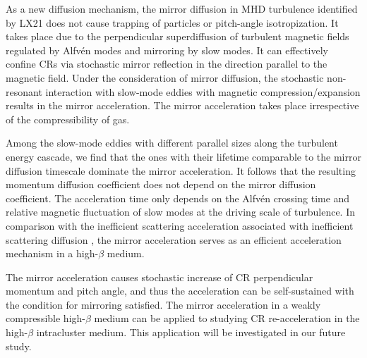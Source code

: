 \documentclass[preprint2,twocolumn,times,tighten]{aastex63}
\begin{document}
{As a new diffusion mechanism,  
the mirror diffusion in MHD turbulence
identified by LX21
does not cause trapping of particles or pitch-angle isotropization. 
It takes place due to the perpendicular superdiffusion of turbulent magnetic fields regulated by Alfv\'{e}n modes 
and mirroring by slow modes. It can effectively confine CRs via stochastic mirror reflection in the direction parallel to the magnetic field. 
Under the consideration of mirror diffusion, 
the stochastic non-resonant interaction with slow-mode eddies with magnetic compression/expansion results in the mirror acceleration. 
The mirror acceleration takes place 
irrespective of the compressibility of gas. 


 







Among the slow-mode eddies with different parallel sizes along the turbulent energy cascade, we find that the ones with their lifetime comparable to the mirror diffusion timescale dominate the mirror acceleration. 
It follows that the resulting momentum diffusion coefficient does not depend on the mirror diffusion coefficient. 
The acceleration time only depends on the Alfv\'{e}n crossing time and relative magnetic fluctuation of slow modes at the driving scale of turbulence. 
In comparison with the inefficient scattering acceleration associated with inefficient scattering diffusion 
\citep{CL06}, 
the mirror acceleration serves as an efficient acceleration mechanism in a high-$\beta$ medium. 



The mirror acceleration causes stochastic increase of CR perpendicular momentum and pitch angle, and thus the acceleration can be self-sustained with the condition for mirroring satisfied. 
The mirror acceleration in a weakly compressible high-$\beta$ medium
can be applied to studying CR re-acceleration in the high-$\beta$ intracluster medium. 
This application will be investigated in our future study. 




}
\end{document}
